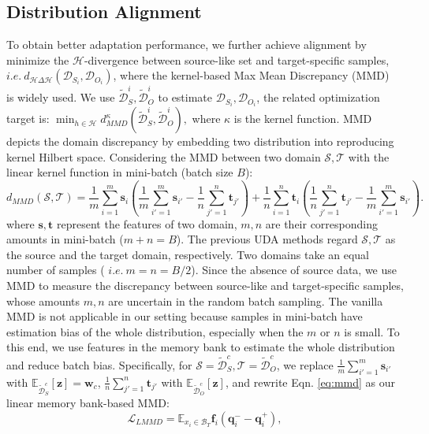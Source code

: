 \documentclass{article}
\def\vf{{\bm{f}}}
\def\vq{{\bm{q}}}
\def\vs{{\bm{s}}}
\def\vt{{\bm{t}}}
\def\vw{{\bm{w}}}
\def\vz{{\bm{z}}}
\begin{document}
\subsection{Distribution Alignment}
To obtain better adaptation performance, we further achieve alignment by minimize the $\mathcal{H}$-divergence between source-like set and target-specific samples, $i.e.\ d_{\mathcal{H}\Delta\mathcal{H}}(\mathcal{D}_{S_i},\mathcal{D}_{O_i})$, where the kernel-based Max Mean Discrepancy (MMD)~\cite{MMD} is widely used. We use $\tilde{\mathcal{D}}_S^i,\tilde{\mathcal{D}}_O^i$ to estimate $\mathcal{D}_{S_i},\mathcal{D}_{O_i}$, the related optimization target is:
$
    \min_{h\in\mathcal{H}} d_{\textit{MMD}}^{\kappa}(\tilde{\mathcal{D}}_S^i,\tilde{\mathcal{D}}_O^i),
$
where $\kappa$ is the kernel function. 
MMD depicts the domain discrepancy by embedding two distribution into reproducing kernel Hilbert space. 
Considering the MMD between two domain $\mathcal{S},\mathcal{T}$ with the linear kernel function in mini-batch (batch size $B$):
\begin{equation}\label{eq:mmd}
    d_{\textit{MMD}}({\mathcal{S}},{\mathcal{T}}) =
\frac{1}{m}\sum_{i=1}^m  \vs_i \left( \frac{1}{m}\sum_{i'=1}^m \vs_{i'} 
- 
 \frac{1}{n} \sum_{j'=1}^n \vt_{j'}  \right)
+
\frac{1}{n}\sum_{i=1}^n \vt_i  \left( \frac{1}{n}\sum_{j'=1}^n \vt_{j'}
-
 \frac{1}{m} \sum_{i'=1}^m \vs_{i'}  \right).
\end{equation}
where $\vs,\vt$ represent the features of two domain, $m,n$ are their corresponding amounts in mini-batch ($m+n=B$). The previous UDA methods regard ${\mathcal{S}},{\mathcal{T}}$ as the source and the target domain, respectively. Two domains take an equal number of samples ( $i.e. \ m=n=B/2$). Since the absence of source data, we use MMD to measure the discrepancy between source-like and target-specific samples, whose amounts $m,n$ are uncertain in the random batch sampling. The vanilla MMD is not applicable in our setting because samples in mini-batch have estimation bias of the whole distribution, especially when the $m$ or $n$ is small. To this end, we use features in the memory bank to estimate the whole distribution and reduce batch bias. Specifically, for ${\mathcal{S}=\tilde{\mathcal{D}}_{S}^c},{\mathcal{T}=\tilde{\mathcal{D}}_{O}^c}$, we replace $\frac{1}{m}\sum_{i'=1}^m \vs_{i'}$ with $\mathbb{E}_{\tilde{\mathcal{D}}_{S}^c}[\vz]=\vw_c$, $\frac{1}{n}\sum_{j'=1}^n \vt_{j'}$ with $\mathbb{E}_{\tilde{\mathcal{D}}_{O}^c}[\vz]$, and rewrite Eqn. \ref{eq:mmd} as our linear memory bank-based MMD:
\begin{equation}
\label{eq:da1}
    \mathcal{L}_{\textit{LMMD}} = \mathbb{E}_{x_i\in \mathcal{B}_T} \vf_i(\vq^-_i-\vq^+_i),
\end{equation}
\end{document}
